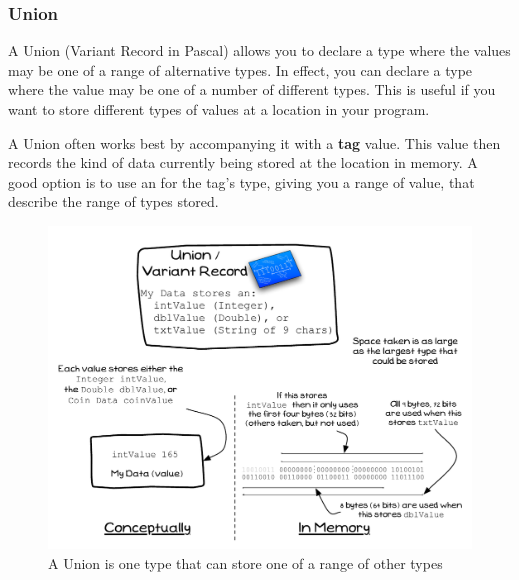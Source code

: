 \clearpage
\subsubsection{Union} %
\label{ssub:union}

A Union (Variant Record in Pascal) allows you to declare a type where the values may be one of a range of alternative types. In effect, you can declare a type where the value may be one of a number of different types. This is useful if you want to store different types of values at a location in your program.

A Union often works best by accompanying it with a \textbf{tag} value. This value then records the kind of data currently being stored at the location in memory. A good option is to use an  for the tag's type, giving you a range of value, that describe the range of types stored.

\begin{figure}[h]
   \centering
   \includegraphics[width=\textwidth]{./topics/type-decl/diagrams/Union} 
   \caption{A Union is one type that can store one of a range of other types}
   \label{fig:type-decl-union}
\end{figure}

